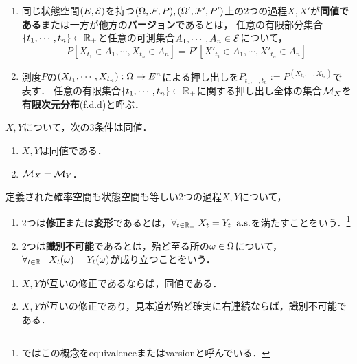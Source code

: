 \documentclass[uplatex,dvipdfmx]{jsreport}
\begin{document}
\begin{definition}\mbox{}
    \begin{enumerate}
        \item 同じ状態空間$(E,\mathcal{E})$を持つ$(\Omega,\mathcal{F},P),(\Omega',\mathcal{F}',P')$上の2つの過程$X,X'$が\textbf{同値である}または一方が他方の\textbf{バージョン}であるとは，
        任意の有限部分集合$\{t_1,\cdots,t_n\}\subset\mathbb{R}_+$と任意の可測集合$A_1,\cdots,A_n\in\mathcal{E}$について，
        \[P[X_{t_1}\in A_1,\cdots,X_{t_n}\in A_n]=P'[X'_{t_1}\in A_1,\cdots,X'_{t_n}\in A_n]\]
        \item 測度$P$の$(X_{t_1},\cdots,X_{t_n}):\Omega\to E^n$による押し出しを$P_{t_1,\cdots,t_n}:=P^{(X_{t_1},\cdots,X_{t_n})}$で表す．
        任意の有限集合$\{t_1,\cdots,t_n\}\subset\mathbb{R}_+$に関する押し出し全体の集合$\mathcal{M}_X$を\textbf{有限次元分布}(f.d.d)と呼ぶ．
    \end{enumerate}
\end{definition}
\begin{lemma}[過程の同値性の特徴付け]
    $X,Y$について，次の3条件は同値．
    \begin{enumerate}
        \item $X,Y$は同値である．
        \item $\mathcal{M}_X=\mathcal{M}_Y$．
    \end{enumerate}
\end{lemma}

\begin{definition}
    定義された確率空間も状態空間も等しい2つの過程$X,Y$について，
    \begin{enumerate}
        \item 2つは\textbf{修正}または\textbf{変形}であるとは，$\forall_{t\in\mathbb{R}_+}\;X_t=Y_t\;\;\mathrm{a.s.}$を満たすことをいう．\footnote{\cite{Nualart}ではこの概念をequivalenceまたはvarsionと呼んでいる．}
        \item 2つは\textbf{識別不可能}であるとは，殆ど至る所の$\omega\in\Omega$について，$\forall_{t\in\mathbb{R}_+}\;X_t(\omega)=Y_t(\omega)$が成り立つことをいう．
    \end{enumerate}
\end{definition}

\begin{lemma}\mbox{}
    \begin{enumerate}
        \item $X,Y$が互いの修正であるならば，同値である．
        \item $X,Y$が互いの修正であり，見本道が殆ど確実に右連続ならば，識別不可能である．
    \end{enumerate}
\end{lemma}
\end{document}
